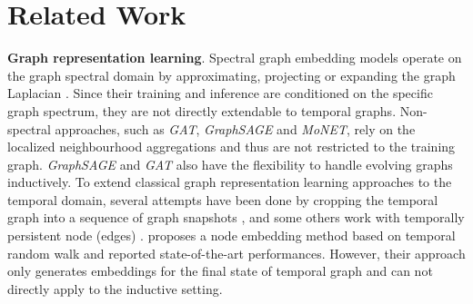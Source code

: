 \documentclass{article} %
\begin{document}
\section{Related Work}
\label{sec:related-work}
\textbf{Graph representation learning}. Spectral graph embedding models operate on the graph spectral domain by approximating, projecting or expanding the graph Laplacian \citep{kipf2016semi,henaff2015deep,defferrard2016convolutional}. Since their training and inference are conditioned on the specific graph spectrum, they are not directly extendable to temporal graphs. Non-spectral approaches, such as \textsl{GAT}, \textsl{GraphSAGE} and \textsl{MoNET}, \citep{monti2017geometric} rely on the localized neighbourhood aggregations and thus are not restricted to the training graph. \textsl{GraphSAGE} and \textsl{GAT} also have the flexibility to handle evolving graphs inductively. To extend classical graph representation learning approaches to the temporal domain, several attempts have been done by cropping the temporal graph into a sequence of graph snapshots \citep{li2018deep,goyal2018dyngem,rahman2018dylink2vec,xu2019generative}, and some others work with temporally persistent node (edges) \citep{trivedi2018representation,ma2019streaming}. \cite{nguyen2018continuous} proposes a node embedding method based on temporal random walk and reported state-of-the-art performances. However, their approach only generates embeddings for the final state of temporal graph and can not directly apply to the inductive setting.
\end{document}
